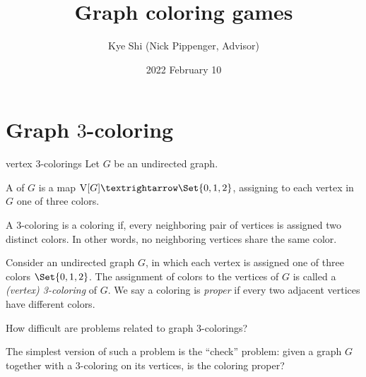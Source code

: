 \documentclass{report-snippet}
\title{Graph coloring games}
\author{Kye Shi (Nick Pippenger, Advisor)}
\date{2022 February 10}
\begin{document}
\section{Graph \(3\)-coloring}



\begin{definition}{vertex 3-colorings}{}%
  Let \(G\) be an undirected graph.

  A  of \(G\) is a map \(\Vertices[G]→\Set{0,1,2}\),
  assigning to each vertex in \(G\) one of three colors.

  A 3-coloring is a  coloring if, every neighboring pair of
  vertices is assigned two distinct colors.  In other words, no neighboring
  vertices share the same color.
\end{definition}

Consider an undirected graph \(G\), in which each vertex is assigned one of
three colors \(\Set{0,1,2}\).  The assignment of colors to the vertices of
\(G\) is called a \emph{(vertex) 3-coloring} of \(G\).  We say a coloring
is \emph{proper} if every two adjacent vertices have different colors.

How difficult are problems related to graph 3-colorings?

The simplest version of such a problem is the ``check'' problem: given a graph
\(G\) together with a 3-coloring on its vertices, is the coloring proper?
\end{document}
